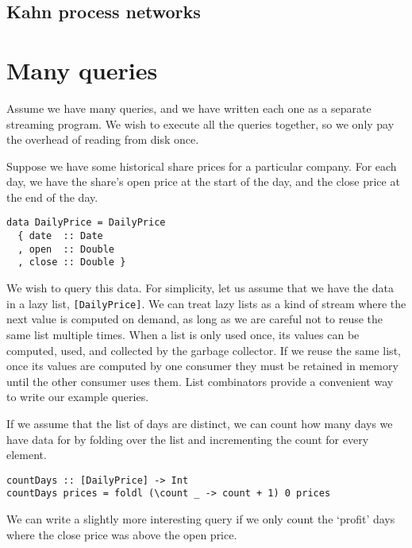 \subsection{Kahn process networks}

\section{Many queries}

Assume we have many queries, and we have written each one as a separate streaming program.
We wish to execute all the queries together, so we only pay the overhead of reading from disk once.

Suppose we have some historical share prices for a particular company.
For each day, we have the share's open price at the start of the day, and the close price at the end of the day.

\begin{lstlisting}
data DailyPrice = DailyPrice
  { date  :: Date
  , open  :: Double
  , close :: Double }
\end{lstlisting}

We wish to query this data.
For simplicity, let us assume that we have the data in a lazy list, \lstinline/[DailyPrice]/.
We can treat lazy lists as a kind of stream where the next value is computed on demand, as long as we are careful not to reuse the same list multiple times.
When a list is only used once, its values can be computed, used, and collected by the garbage collector.
If we reuse the same list, once its values are computed by one consumer they must be retained in memory until the other consumer uses them.
List combinators provide a convenient way to write our example queries.

If we assume that the list of days are distinct, we can count how many days we have data for by folding over the list and incrementing the count for every element.

\begin{lstlisting}
countDays :: [DailyPrice] -> Int
countDays prices = foldl (\count _ -> count + 1) 0 prices
\end{lstlisting}

We can write a slightly more interesting query if we only count the `profit' days where the close price was above the open price.

